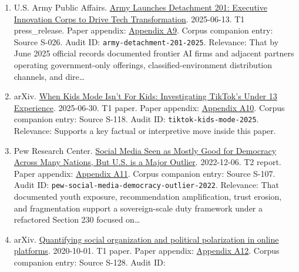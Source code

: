 \documentclass[
  american,
  11pt,
  letterpaper,
]{article}
\begin{document}
\begin{enumerate}
  \texttt{anthropic-claude-gov-2025}. Relevance: That by June 6, 2025
  Anthropic had publicly launched a government-specific model line for
  U.S. national security customers.
\item
  U.S. Army Public Affairs.
  \href{https://www.army.mil/article/286317/army_launches_detachment_201_executive_innovation_corps_to_drive_tech_transformation}{Army
  Launches Detachment 201: Executive Innovation Corps to Drive Tech
  Transformation}. 2025-06-13. T1 press\_release. Paper appendix:
  \hyperref[ch-10-appendix-a9-army-launches-detachment-201-executive-innovation-corps-to-drive-tech-transformation]{Appendix
  A9}. Corpus companion entry: Source S-026. Audit ID:
  \texttt{army-detachment-201-2025}. Relevance: That by June 2025
  official records documented frontier AI firms and adjacent partners
  operating government-only offerings, classified-environment
  distribution channels, and dire\ldots{}
\item
  arXiv. \href{https://arxiv.org/abs/2507.00299}{When Kids Mode Isn't
  For Kids: Investigating TikTok's Under 13 Experience}. 2025-06-30. T1
  paper. Paper appendix:
  \hyperref[ch-10-appendix-a10-when-kids-mode-isn-t-for-kids-investigating-tiktok-s-under-13-experience]{Appendix
  A10}. Corpus companion entry: Source S-118. Audit ID:
  \texttt{tiktok-kids-mode-2025}. Relevance: Supports a key factual or
  interpretive move inside this paper.
\item
  Pew Research Center.
  \href{https://www.pewresearch.org/global/2022/12/06/social-media-seen-as-mostly-good-for-democracy-across-many-nations-but-u-s-is-a-major-outlier/}{Social
  Media Seen as Mostly Good for Democracy Across Many Nations, But U.S.
  is a Major Outlier}. 2022-12-06. T2 report. Paper appendix:
  \hyperref[ch-10-appendix-a11-social-media-seen-as-mostly-good-for-democracy-across-many-nations-but-u-s-is-a-major-outlier]{Appendix
  A11}. Corpus companion entry: Source S-107. Audit ID:
  \texttt{pew-social-media-democracy-outlier-2022}. Relevance: That
  documented youth exposure, recommendation amplification, trust
  erosion, and fragmentation support a sovereign-scale duty framework
  under a refactored Section 230 focused on\ldots{}
\item
  arXiv. \href{https://arxiv.org/abs/2010.00590}{Quantifying social
  organization and political polarization in online platforms}.
  2020-10-01. T1 paper. Paper appendix:
  \hyperref[ch-10-appendix-a12-quantifying-social-organization-and-political-polarization-in-online-platforms]{Appendix
  A12}. Corpus companion entry: Source S-128. Audit ID:

\end{enumerate}
\end{document}
